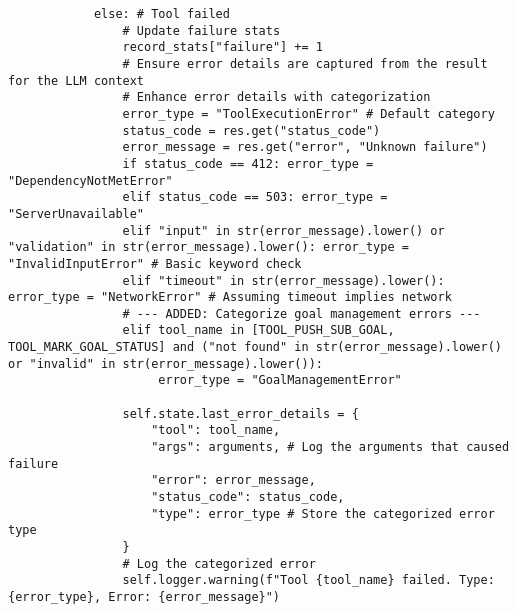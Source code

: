 \documentclass[12pt,a4paper]{article}
\begin{document}
\begin{pageablecode}
\begin{verbatim}
            else: # Tool failed
                # Update failure stats
                record_stats["failure"] += 1
                # Ensure error details are captured from the result for the LLM context
                # Enhance error details with categorization
                error_type = "ToolExecutionError" # Default category
                status_code = res.get("status_code")
                error_message = res.get("error", "Unknown failure")
                if status_code == 412: error_type = "DependencyNotMetError"
                elif status_code == 503: error_type = "ServerUnavailable"
                elif "input" in str(error_message).lower() or "validation" in str(error_message).lower(): error_type = "InvalidInputError" # Basic keyword check
                elif "timeout" in str(error_message).lower(): error_type = "NetworkError" # Assuming timeout implies network
                # --- ADDED: Categorize goal management errors ---
                elif tool_name in [TOOL_PUSH_SUB_GOAL, TOOL_MARK_GOAL_STATUS] and ("not found" in str(error_message).lower() or "invalid" in str(error_message).lower()):
                     error_type = "GoalManagementError"

                self.state.last_error_details = {
                    "tool": tool_name,
                    "args": arguments, # Log the arguments that caused failure
                    "error": error_message,
                    "status_code": status_code,
                    "type": error_type # Store the categorized error type
                }
                # Log the categorized error
                self.logger.warning(f"Tool {tool_name} failed. Type: {error_type}, Error: {error_message}")



\end{verbatim}
\end{pageablecode}
\end{document}
